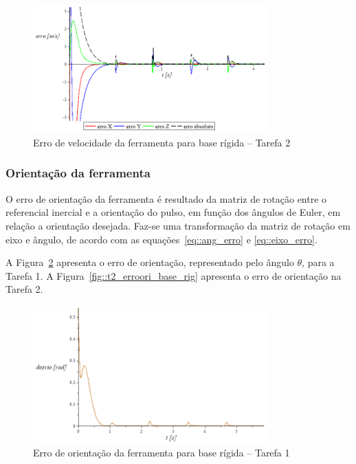 \begin{figure}[h!]
	\centering 
 	\includegraphics[width=0.80\textwidth]{figs/t2_errovelf_base_rig}
 	\caption{Erro de velocidade da ferramenta para base rígida -- Tarefa 2}
 	\label{fig::t2_errovelf_base_rig}
\end{figure}

\subsubsection{Orientação da ferramenta}

O erro de orientação da ferramenta é resultado da matriz de rotação entre o
referencial inercial e a orientação do pulso, em função dos ângulos de Euler, em
relação a orientação desejada. Faz-se uma transformação da matriz de rotação em
eixo e ângulo, de acordo com as equações~\ref{eq::ang_erro} e
\ref{eq::eixo_erro}.

A Figura~\ref{fig::t1_erroori_base_rig} apresenta o erro de orientação,
representado pelo ângulo $\theta$, para a Tarefa 1. A
Figura~\ref{fig::t2_erroori_base_rig} apresenta o erro de orientação na Tarefa 2.

\begin{figure}[h!]
	\centering 
 	\includegraphics[width=0.80\textwidth]{figs/t1_erroori_base_rig}
 	\caption{Erro de orientação da ferramenta para base rígida -- Tarefa
 	1}
 	\label{fig::t1_erroori_base_rig}
\end{figure}




